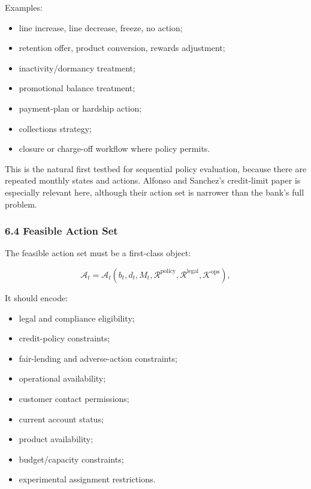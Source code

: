 \documentclass[
]{article}
\providecommand{\tightlist}{%
  \setlength{\itemsep}{0pt}\setlength{\parskip}{0pt}}
\begin{document}
Examples:

\begin{itemize}
\tightlist
\item
  line increase, line decrease, freeze, no action;
\item
  retention offer, product conversion, rewards adjustment;
\item
  inactivity/dormancy treatment;
\item
  promotional balance treatment;
\item
  payment-plan or hardship action;
\item
  collections strategy;
\item
  closure or charge-off workflow where policy permits.
\end{itemize}

This is the natural first testbed for sequential policy evaluation,
because there are repeated monthly states and actions. Alfonso and
Sanchez's credit-limit paper is especially relevant here, although their
action set is narrower than the bank's full problem.

\hypertarget{feasible-action-set}{%
\subsubsection{6.4 Feasible Action Set}\label{feasible-action-set}}

The feasible action set must be a first-class object:

\begin{equation}
  \mathcal{A}_t
  =
  \mathcal{A}_t\!\left(
    b_t,d_t,M_t,
    \mathcal{R}^{\mathrm{policy}},
    \mathcal{R}^{\mathrm{legal}},
    \mathcal{K}^{\mathrm{ops}}
  \right),
  \label{eq:feasible-action-set}
\end{equation}

It should encode:

\begin{itemize}
\tightlist
\item
  legal and compliance eligibility;
\item
  credit-policy constraints;
\item
  fair-lending and adverse-action constraints;
\item
  operational availability;
\item
  customer contact permissions;
\item
  current account status;
\item
  product availability;
\item
  budget/capacity constraints;
\item
  experimental assignment restrictions.
\end{itemize}
\end{document}
